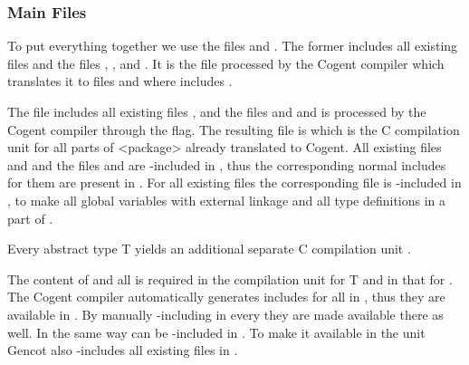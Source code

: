 \subsubsection{Main Files}

To put everything together we use the files  and . The former includes all 
existing  files and the files , , and
.
It is the file processed by the Cogent compiler which translates it to files  
and  where  includes . 

The file  includes all existing files 
, and the files  and  and is processed by the Cogent compiler through the 
 flag. The resulting file is  which is the C compilation unit for 
all parts of <package> already translated to Cogent. All existing files  and  
and the files  and  are 
-included in , thus the corresponding normal includes for them are present in 
.
For all existing files  the corresponding file  is -included in 
, to make all global variables with external linkage and all type definitions in  
a part of .

Every abstract type T yields an additional separate C compilation unit . 

The content of  and all  is required in the compilation unit for T and in 
that for . The Cogent compiler automatically generates includes for all  in 
, 
thus they are available in . By manually -including  in every 
 they are made available there as well. In the same way  can be -included
in . To make it available in the  unit Gencot also -includes all 
existing  files in .

 
